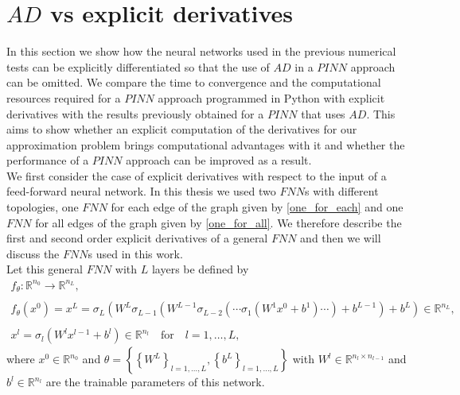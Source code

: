 \section{$AD$ vs explicit derivatives}
\label{ch3:sec3}

In this section we show how the neural networks used in the previous numerical tests can be explicitly differentiated so that the use of $AD$ in a $PINN$ approach can be omitted. We compare the time to convergence and the computational resources required for a $PINN$ approach programmed in Python with explicit derivatives with the results previously obtained for a $PINN$ that uses $AD$. This aims to show whether an explicit computation of the derivatives for our approximation problem brings computational advantages with it and whether the performance of a $PINN$ approach can be improved as a result. \\
We first consider the case of explicit derivatives with respect to the input of a feed-forward neural network. In this thesis we used two $FNN$s with different topologies, one $FNN$ for each edge of the graph given by \cref{one_for_each} and one $FNN$ for all edges of the graph given by \cref{one_for_all}. We therefore describe the first and second order explicit derivatives of a general $FNN$ and then we will discuss the $FNN$s used in this work. \\
Let this general $FNN$ with $L$ layers be defined by 
\begin{equation} 
    \label{model prediction}
    \begin{gathered}
        f_{\theta} \colon \mathbb{R}^{n_0} \to \mathbb{R}^{n_L}, \\
        \\
        f_{\theta}\left(x^0\right) = x^L = \sigma_L\left(W^L \sigma_{L-1}\left(W^{L-1}\sigma_{L-2}\left(\cdots \sigma_{1}\left(W^{1}x^0 + b^1\right) \cdots\right) + b^{L-1}\right) + b^{L}\right) \in \mathbb{R}^{n_L}, \\
        \\
        x^l = \sigma_l\left(W^l x^{l-1} + b^l\right) \in \mathbb{R}^{n_l} \quad \text{for} \quad l = 1, \ldots, L,
    \end{gathered} 
\end{equation} 
where $x^0 \in \mathbb{R}^{n_0}$ and $\theta = \left\{ \left\{ W^L \right\}_{l = 1, \ldots, L}, \left\{ b^L \right\}_{l = 1, \ldots, L} \right\}$ with $W^l \in \mathbb{R}^{n_l \times n_{l-1}}$ and $b^l \in \mathbb{R}^{n_l}$ are the trainable parameters of this network. \\
